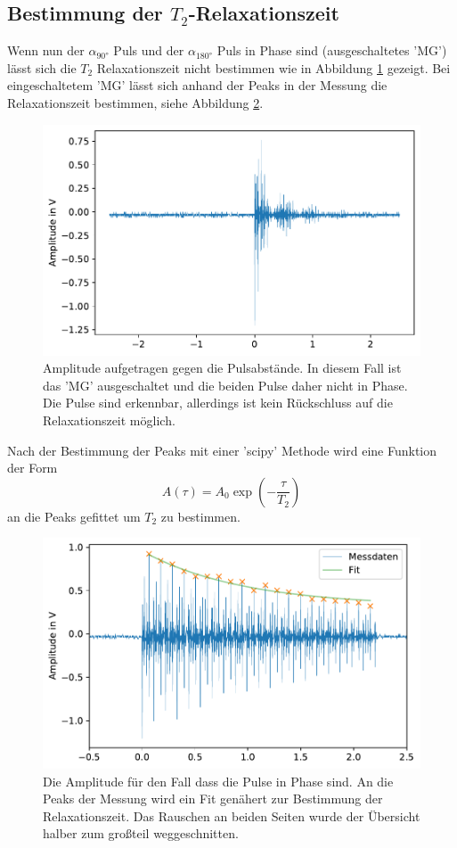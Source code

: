 \subsection{Bestimmung der $T_2$-Relaxationszeit}
Wenn nun der $\alpha_{90°}$ Puls und der $\alpha_{180°}$ Puls in Phase sind (ausgeschaltetes 'MG') lässt sich die $T_2$ Relaxationszeit nicht bestimmen wie in Abbildung \ref{fig:df54} gezeigt.
Bei eingeschaltetem 'MG' lässt sich anhand der Peaks in der Messung die Relaxationszeit bestimmen, siehe Abbildung \ref{fig:df52}.
\begin{figure}[H]
    \center
    \includegraphics[scale = 0.75]{plots/df54.pdf}
    \caption{Amplitude aufgetragen gegen die Pulsabstände. In diesem Fall ist das 'MG' ausgeschaltet und die beiden Pulse daher nicht in Phase. Die Pulse sind erkennbar, allerdings ist kein Rückschluss auf die Relaxationszeit möglich.} 
    \label{fig:df54}
\end{figure}
Nach der Bestimmung der Peaks mit einer 'scipy' Methode \cite{2020SciPy-NMeth} wird eine Funktion der Form
\begin{equation*}
    A\left(\tau\right) = A_0 \exp\left( - \frac{\tau}{T_2}\right)
\end{equation*}
an die Peaks gefittet um $T_2$ zu bestimmen.
\begin{figure}[ht]
    \center
    \includegraphics[scale = 0.75]{plots/df52.pdf}
    \caption{Die Amplitude für den Fall dass die Pulse in Phase sind. An die Peaks der Messung wird ein Fit genähert zur Bestimmung der Relaxationszeit. Das Rauschen an beiden Seiten wurde der Übersicht halber zum großteil weggeschnitten.}
    \label{fig:df52}
\end{figure}
